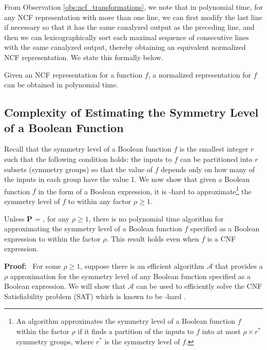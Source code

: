 \medskip
From Observation \ref{obs:ncf_transformations},
we note that in polynomial time, for any NCF representation with more than one line,
we can first modify the last line if necessary so that it has the same canalyzed output as the preceding line,
and then we can lexicographically sort
each maximal sequence of consecutive lines with the same canalyzed output,
thereby obtaining an equivalent normalized NCF representation.
We state this formally below.

\begin{observation}\label{obs:normalization_poly}
Given an NCF representation for a function $f$, a normalized
representation for $f$ can be obtained in polynomial time. \QED
\end{observation}

\subsection{Complexity of Estimating the Symmetry Level of a 
Boolean Function}
\label{sse:symmetry_level_hardness}

Recall that the symmetry level of a Boolean function $f$ is the smallest
integer $r$ such that the following condition holds:
the  inputs to $f$ can be partitioned into $r$ subsets 
(symmetry groups) so that the value of $f$ depends only on 
how many of the inputs in each group have the value 1.
We now show that given a Boolean function $f$
in the form of a Boolean expression, it is \cnp-hard to 
approximate\footnote{An algorithm approximates the symmetry
level of a Boolean function $f$ within the factor $\rho$ if it finds a
partition of the inputs to $f$ into at most $\rho \times r^*$ symmetry
groups, where $r^*$ is the symmetry level of $f$.}
the symmetry level of $f$ to within any factor $\rho \geq 1$.

\newcommand{\cala}{\mbox{$\mathcal{A}$}}

\begin{theorem}\label{thm:approx_sym_level_hard}
Unless \textbf{P} = \cnp,
for any $\rho \geq 1$, there is no polynomial time 
algorithm for approximating the 
symmetry level of a Boolean function $f$ 
specified as a Boolean expression to within the factor $\rho$.
This result holds even when $f$ is a CNF expression.
\end{theorem}

\noindent
\textbf{Proof:}~ For some $\rho \geq 1$, suppose there is an efficient algorithm \cala{} 
that provides a $\rho$ approximation for the symmetry level
of any Boolean function specified as a Boolean expression.
We will show that \cala{} can be used to efficiently solve
the CNF Satisfiability problem (SAT) which is known 
to be \cnp-hard \cite{GJ-1979}.

